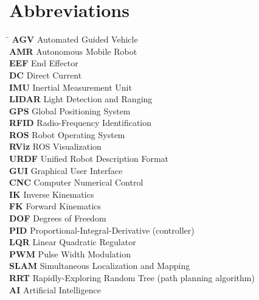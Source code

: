 \chapter*{Abbreviations}
\begin{tabbing}
\hspace{2cm} \= \kill %
\textbf{AGV} \> Automated Guided Vehicle \\
\textbf{AMR} \> Autonomous Mobile Robot \\
\textbf{EEF} \> End Effector \\
\textbf{DC} \> Direct Current \\
\textbf{IMU} \> Inertial Measurement Unit \\
\textbf{LIDAR} \> Light Detection and Ranging \\
\textbf{GPS} \> Global Positioning System \\
\textbf{RFID} \> Radio-Frequency Identification \\
\textbf{ROS} \> Robot Operating System \\
\textbf{RViz} \> ROS Visualization \\
\textbf{URDF} \> Unified Robot Description Format \\
\textbf{GUI} \> Graphical User Interface \\
\textbf{CNC} \> Computer Numerical Control \\
\textbf{IK} \> Inverse Kinematics \\
\textbf{FK} \> Forward Kinematics \\
\textbf{DOF} \> Degrees of Freedom \\
\textbf{PID} \> Proportional-Integral-Derivative (controller) \\
\textbf{LQR} \> Linear Quadratic Regulator \\
\textbf{PWM} \> Pulse Width Modulation \\
\textbf{SLAM} \> Simultaneous Localization and Mapping \\
\textbf{RRT} \> Rapidly-Exploring Random Tree (path planning algorithm) \\
\textbf{AI} \> Artificial Intelligence \\
\end{tabbing}